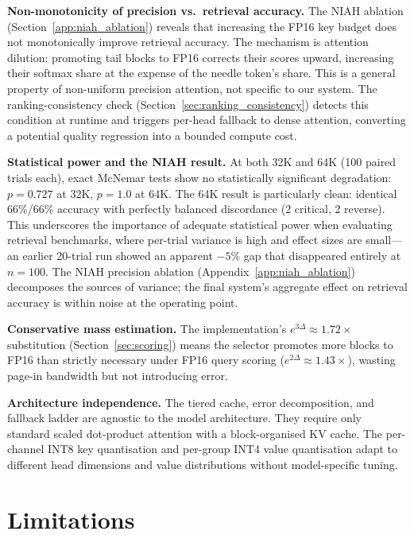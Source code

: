 \documentclass[10pt,twocolumn,a4paper]{article}
\theoremstyle{definition}
\theoremstyle{remark}
\begin{document}
\textbf{Non-monotonicity of precision vs.\ retrieval accuracy.}  The NIAH ablation (Section~\ref{app:niah_ablation}) reveals that increasing the FP16 key budget does not monotonically improve retrieval accuracy.  The mechanism is attention dilution: promoting tail blocks to FP16 corrects their scores upward, increasing their softmax share at the expense of the needle token's share.  This is a general property of non-uniform precision attention, not specific to our system.  The ranking-consistency check (Section~\ref{sec:ranking_consistency}) detects this condition at runtime and triggers per-head fallback to dense attention, converting a potential quality regression into a bounded compute cost.

\textbf{Statistical power and the NIAH result.}  At both 32K and 64K (100 paired trials each), exact McNemar tests show no statistically significant degradation: $p{=}0.727$ at 32K, $p{=}1.0$ at 64K.  The 64K result is particularly clean: identical 66\%/66\% accuracy with perfectly balanced discordance (2 critical, 2 reverse).  This underscores the importance of adequate statistical power when evaluating retrieval benchmarks, where per-trial variance is high and effect sizes are small---an earlier 20-trial run showed an apparent $-5\%$ gap that disappeared entirely at $n{=}100$.  The NIAH precision ablation (Appendix~\ref{app:niah_ablation}) decomposes the sources of variance; the final system's aggregate effect on retrieval accuracy is within noise at the operating point.

\textbf{Conservative mass estimation.}  The implementation's $e^{3\Delta} \approx 1.72\times$ substitution (Section~\ref{sec:scoring}) means the selector promotes more blocks to FP16 than strictly necessary under FP16 query scoring ($e^{2\Delta} \approx 1.43\times$), wasting page-in bandwidth but not introducing error.

\textbf{Architecture independence.}  The tiered cache, error decomposition, and fallback ladder are agnostic to the model architecture.  They require only standard scaled dot-product attention with a block-organised KV cache.  The per-channel INT8 key quantisation and per-group INT4 value quantisation adapt to different head dimensions and value distributions without model-specific tuning.


\section{Limitations}
\label{sec:limitations}
\end{document}
